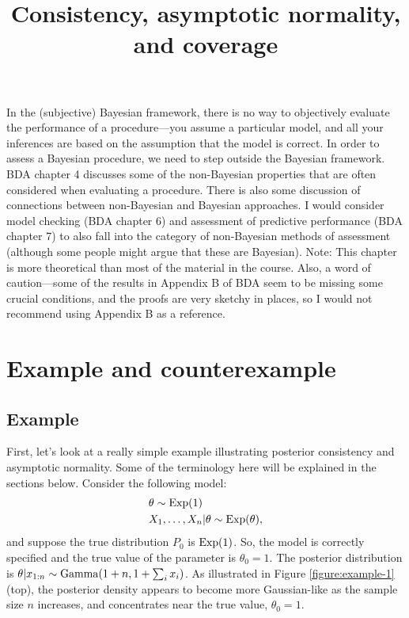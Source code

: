 \documentclass[12pt]{article}
\title{Consistency, asymptotic normality, and coverage}
\author{}
\date{}
\begin{document}
\maketitle
\tableofcontents
\thispagestyle{firststyle}

\vspace{2em}

In the (subjective) Bayesian framework, there is no way to objectively evaluate the performance of a procedure---you assume a particular model, and all your inferences are based on the assumption that the model is correct.  In order to assess a Bayesian procedure, we need to step outside the Bayesian framework. BDA chapter 4 discusses some of the non-Bayesian properties that are often considered when evaluating a procedure. There is also some discussion of connections between non-Bayesian and Bayesian approaches.
I would consider model checking (BDA chapter 6) and assessment of predictive performance (BDA chapter 7) to also fall into the category of non-Bayesian methods of assessment (although some people might argue that these are Bayesian). 
Note: This chapter is more theoretical than most of the material in the course. Also, a word of caution---some of the results in Appendix B of BDA seem to be missing some crucial conditions, and the proofs are very sketchy in places, so I would not recommend using Appendix B as a reference.


\section{Example and counterexample}

\subsection{Example}

First, let's look at a really simple example illustrating posterior consistency and asymptotic normality. Some of the terminology here will be explained in the sections below. Consider the following model:
\begin{align*}
& \theta \sim \operatorname*{Exp}(1)\\
& X_1,\ldots,X_n | \theta \sim \operatorname*{Exp}(\theta),
\end{align*}
and suppose the true distribution $P_0$ is $\operatorname*{Exp}(1)$.  So, the model is correctly specified and the true value of the parameter is $\theta_0 = 1$. The posterior distribution is $\theta | x_{1:n} \sim\operatorname*{Gamma}(1+n,1+\sum_i x_i)$. As illustrated in Figure \ref{figure:example-1} (top), the posterior density appears to become more Gaussian-like as the sample size $n$ increases, and concentrates near the true value, $\theta_0 = 1$.
\end{document}
